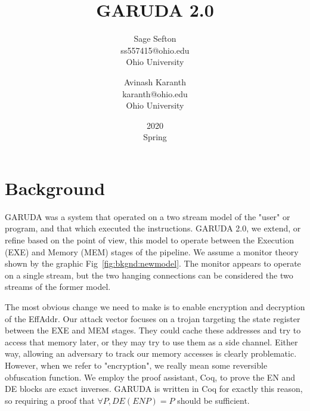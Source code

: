 \documentclass[12pt, letterpaper]{article}
\def \sysname {\textsc{GARUDA 2.0}\xspace}
\def \oldname {\textsc{GARUDA}\xspace}
\begin{document}
  \title{\sysname}
  \date{2020\\ Spring}

  \author{
    Sage Sefton \\
    ss557415@ohio.edu \\
    Ohio University \\
    \and
    Avinash Karanth  \\
    karanth@ohio.edu \\
    Ohio University  \\
  }

  \maketitle
  \cleardoublepage

  \section{Background}\label{sec:bkgnd}

    \oldname was a system that operated on a two stream model of the "user" or program, and that which executed the instructions.
    \sysname, we extend, or refine based on the point of view, this model to operate between the Execution (EXE) and Memory (MEM) stages of the pipeline.
    We assume a monitor theory shown by the graphic Fig~\ref{fig:bkgnd:newmodel}.
    The monitor appears to operate on a single stream, but the two hanging connections can be considered the two streams of the former model.

    The most obvious change we need to make is to enable encryption and decryption of the EffAddr.
    Our attack vector focuses on a trojan targeting the state register between the EXE and MEM stages.
    They could cache these addresses and try to access that memory later, or they may try to use them as a side channel.
    Either way, allowing an adversary to track our memory accesses is clearly problematic.
    However, when we refer to "encryption", we really mean some reversible obfuscation function.
    We employ the proof assistant, Coq, to prove the EN and DE blocks are exact inverses.
    \oldname is written in Coq for exactly this reason, so requiring a proof that $\forall P, DE (EN P) = P$ should be sufficient.
\end{document}
